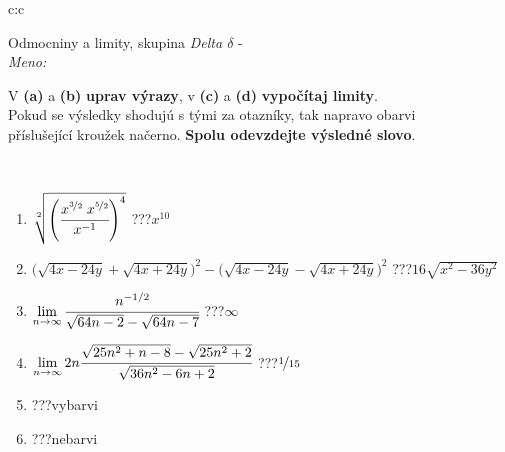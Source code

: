 \documentclass[10pt]{report}
\begin{document}
\newpage
\thispagestyle{empty}
\begin{tabular}{c:c}
\begin{minipage}[c][104.5mm][t]{0.5\linewidth}
\begin{center}
\vspace{7mm}
{\huge Odmocniny a limity, skupina \textit{Delta $\delta$} -}\\[5mm]
\textit{Meno:}\phantom{xxxxxxxxxxxxxxxxxxxxxxxxxxxxxxxxxxxxxxxxxxxxxxxxxxxxxxxxxxxxxxxxx}\\[5mm]
\begin{minipage}{0.95\linewidth}
\begin{center}
V \textbf{(a)} a \textbf{(b)} \textbf{uprav výrazy}, v \textbf{(c)} a \textbf{(d)} \textbf{vypočítaj limity}.\\Pokud se výsledky shodujú s tými za otazníky, tak napravo obarvi\\příslušející kroužek načerno. \textbf{Spolu odevzdejte výsledné slovo}.
\end{center}
\end{minipage}
\\[1mm]
\begin{minipage}{0.79\linewidth}
\begin{center}
\begin{varwidth}{\linewidth}
\begin{enumerate}
\small
\item $\sqrt[2]{\left(\cfrac{x^{\nicefrac{3}{2}}\;x^{\nicefrac{5}{2}}}{x^{-1}}\right)^{4}}$\quad \dotfill\; ???\;\dotfill \quad $x^{10}$
\item {\footnotesize{\scriptsize$\big(\sqrt{4x-24y}+\sqrt{4x+24y}\big)^2-\big(\sqrt{4x-24y}-\sqrt{4x+24y}\big)^2$}\quad \dotfill\; ???\;\dotfill \quad $16\sqrt{x^2-36y^2}$}
\item $\lim\limits_{n\to\infty}\cfrac{n^{-1/2}}{\sqrt{64n-2}-\sqrt{64n-7}}$\quad \dotfill\; ???\;\dotfill \quad $\infty$
\item $\lim\limits_{n\to\infty}2n\cfrac{\sqrt{25n^2+n-8}-\sqrt{25n^2+2}}{\sqrt{36n^2-6n+2}}$\quad \dotfill\; ???\;\dotfill \quad $\nicefrac{1}{15}$
\item \quad \dotfill\; ???\;\dotfill \quad vybarvi
\item \quad \dotfill\; ???\;\dotfill \quad nebarvi
\end{enumerate}
\end{varwidth}
\end{center}
\end{minipage}
\begin{minipage}{0.20\linewidth}

\end{minipage}
\end{center}
\end{minipage}
\end{tabular}
\end{document}
